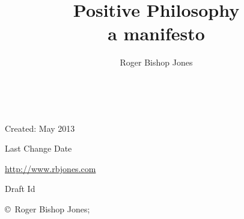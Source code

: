 \documentclass[10pt,titlepage,openany]{article}
\author{Roger Bishop Jones}
\title{Positive Philosophy\\a manifesto}
\date{\ }
\begin{document}
\begin{titlepage}
\maketitle


\begin{centering}

{\footnotesize

Created: May 2013

Last Change $ $Date$ $

\href{http://www.rbjones.com/}
{http://www.rbjones.com}

Draft $ $Id$ $

\copyright\ Roger Bishop Jones;

}%

\end{centering}

\thispagestyle{empty}
\end{titlepage}

{\parskip=0pt\tableofcontents}
\end{document}
